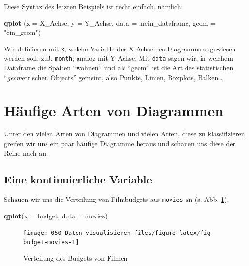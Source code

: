 \documentclass[12pt,ngerman,]{book}
\makeatletter
\newenvironment{Shaded}{\begin{snugshade}}{\end{snugshade}}
\newcommand{\KeywordTok}[1]{\textcolor[rgb]{0.13,0.29,0.53}{\textbf{#1}}}
\newcommand{\DataTypeTok}[1]{\textcolor[rgb]{0.13,0.29,0.53}{#1}}
\newcommand{\StringTok}[1]{\textcolor[rgb]{0.31,0.60,0.02}{#1}}
\newcommand{\NormalTok}[1]{#1}
\newenvironment{kframe}{%
\medskip{}
\setlength{\fboxsep}{.8em}
 \def\at@end@of@kframe{}%
 \ifinner\ifhmode%
  \def\at@end@of@kframe{\end{minipage}}%
  \begin{minipage}{\columnwidth}%
 \fi\fi%
 \def\FrameCommand##1{\hskip\@totalleftmargin \hskip-\fboxsep
 \colorbox{shadecolor}{##1}\hskip-\fboxsep
     \hskip-\linewidth \hskip-\@totalleftmargin \hskip\columnwidth}%
 \MakeFramed {\advance\hsize-\width
   \@totalleftmargin\z@ \linewidth\hsize
   \@setminipage}}%
 {\par\unskip\endMakeFramed%
 \at@end@of@kframe}
\renewenvironment{Shaded}{\begin{kframe}}{\end{kframe}}
\theoremstyle{definition}
\theoremstyle{definition}
\theoremstyle{remark}
\makeatother
\begin{document}
Diese Syntax des letzten Beispiels ist recht einfach, nämlich:

\begin{Shaded}
\begin{Highlighting}[]
\KeywordTok{qplot}\NormalTok{ (}\DataTypeTok{x =}\NormalTok{ X_Achse, }
       \DataTypeTok{y =}\NormalTok{ Y_Achse, }
       \DataTypeTok{data =}\NormalTok{ mein_dataframe, }
       \DataTypeTok{geom =} \StringTok{"ein_geom"}\NormalTok{)}
\end{Highlighting}
\end{Shaded}

Wir definieren mit \texttt{x}, welche Variable der X-Achse des Diagramms
zugewiesen werden soll, z.B. \texttt{month}; analog mit Y-Achse. Mit
\texttt{data} sagen wir, in welchem Dataframe die Spalten ``wohnen'' und
als ``geom'' ist die Art des statistischen ``\emph{geom}etrischen
Objects'' gemeint, also Punkte, Linien, Boxplots, Balken\ldots{}

\section{Häufige Arten von
Diagrammen}\label{haufige-arten-von-diagrammen}

Unter den vielen Arten von Diagrammen und vielen Arten, diese zu
klassifizieren greifen wir uns ein paar häufige Diagramme heraus und
schauen uns diese der Reihe nach an.

\subsection{Eine kontinuierliche
Variable}\label{eine-kontinuierliche-variable}

Schauen wir uns die Verteilung von Filmbudgets aus \texttt{movies} an
(s. Abb. \ref{fig:fig-budget-movies}).

\begin{Shaded}
\begin{Highlighting}[]

\KeywordTok{qplot}\NormalTok{(}\DataTypeTok{x =}\NormalTok{ budget, }\DataTypeTok{data =}\NormalTok{ movies)}
\end{Highlighting}
\end{Shaded}

\begin{figure}

{\centering \texttt{[image: 050\_Daten\_visualisieren\_files/figure-latex/fig-budget-movies-1]} 

}

\caption{Verteilung des Budgets von Filmen}\label{fig:fig-budget-movies}
\end{figure}
\end{document}
